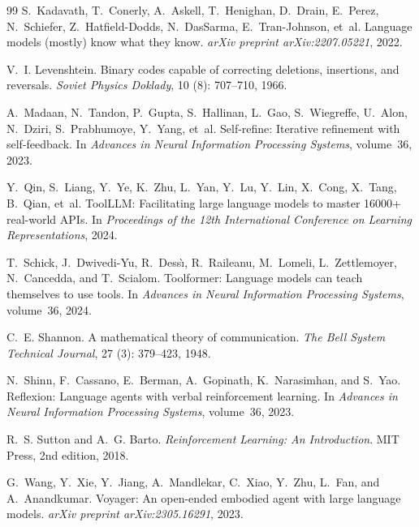 \documentclass[11pt]{article}
\begin{document}
\begin{thebibliography}{99}
S.~Kadavath, T.~Conerly, A.~Askell, T.~Henighan, D.~Drain, E.~Perez,
  N.~Schiefer, Z.~Hatfield-Dodds, N.~DasSarma, E.~Tran-Johnson, et~al.
\newblock Language models (mostly) know what they know.
\newblock \emph{arXiv preprint arXiv:2207.05221}, 2022.

V.~I. Levenshtein.
\newblock Binary codes capable of correcting deletions, insertions, and
  reversals.
\newblock \emph{Soviet Physics Doklady}, 10 (8): 707--710,
  1966.

A.~Madaan, N.~Tandon, P.~Gupta, S.~Hallinan, L.~Gao, S.~Wiegreffe,
  U.~Alon, N.~Dziri, S.~Prabhumoye, Y.~Yang, et~al.
\newblock Self-refine: Iterative refinement with self-feedback.
\newblock In \emph{Advances in Neural Information Processing Systems},
  volume~36, 2023.

Y.~Qin, S.~Liang, Y.~Ye, K.~Zhu, L.~Yan, Y.~Lu, Y.~Lin, X.~Cong, X.~Tang,
  B.~Qian, et~al.
\newblock ToolLLM: Facilitating large language models to master 16000+
  real-world APIs.
\newblock In \emph{Proceedings of the 12th International Conference on Learning
  Representations}, 2024.

T.~Schick, J.~Dwivedi-Yu, R.~Dess{\`{\i}}, R.~Raileanu, M.~Lomeli,
  L.~Zettlemoyer, N.~Cancedda, and T.~Scialom.
\newblock Toolformer: Language models can teach themselves to use tools.
\newblock In \emph{Advances in Neural Information Processing Systems},
  volume~36, 2024.

C.~E. Shannon.
\newblock A mathematical theory of communication.
\newblock \emph{The Bell System Technical Journal}, 27 (3):
  379--423, 1948.

N.~Shinn, F.~Cassano, E.~Berman, A.~Gopinath, K.~Narasimhan, and S.~Yao.
\newblock Reflexion: Language agents with verbal reinforcement learning.
\newblock In \emph{Advances in Neural Information Processing Systems},
  volume~36, 2023.

R.~S. Sutton and A.~G. Barto.
\newblock \emph{Reinforcement Learning: An Introduction}.
\newblock MIT Press, 2nd edition, 2018.

G.~Wang, Y.~Xie, Y.~Jiang, A.~Mandlekar, C.~Xiao, Y.~Zhu, L.~Fan, and
  A.~Anandkumar.
\newblock Voyager: An open-ended embodied agent with large language models.
\newblock \emph{arXiv preprint arXiv:2305.16291}, 2023.


\end{thebibliography}
\end{document}
